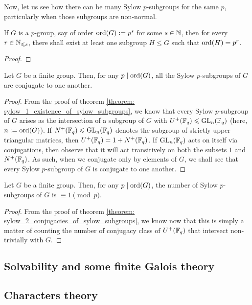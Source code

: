         Now, let us see how there can be many Sylow $p$-subgroups for the same $p$, particularly when those subgroups are non-normal.
        \begin{lemma} \label{lemma: subgroups_of_p_groups}
            If $G$ is a $p$-group, say of order $\operatorname{ord}(G) := p^s$ for some $s \in \mathbb{N}$, then for every $r \in \mathbb{N}_{\leqslant s}$, there shall exist at least one subgroup $H \leq G$ such that $\operatorname{ord}(H) = p^r$.
        \end{lemma}
            \begin{proof}
                
            \end{proof}
        \begin{theorem} \label{theorem: sylow_2_conjugacies_of_sylow_subgroups}
            Let $G$ be a finite group. Then, for any $p \mid \operatorname{ord}(G)$, all the Sylow $p$-subgroups of $G$ are conjugate to one another. 
        \end{theorem}
            \begin{proof}
                From the proof of theorem \ref{theorem: sylow_1_existence_of_sylow_subgroups}, we know that every Sylow $p$-subgroup of $G$ arises as the intersection of a subgroup of $G$ with $U^+(\mathbb{F}_q) \leqslant \mathrm{GL}_n(\mathbb{F}_q)$ (here, $n := \operatorname{ord}(G)$). If $N^+(\mathbb{F}_q) \leqslant \mathrm{GL}_n(\mathbb{F}_q)$ denotes the subgroup of strictly upper triangular matrices, then $U^+(\mathbb{F}_q) = 1 + N^+(\mathbb{F}_q)$. If $\mathrm{GL}_n(\mathbb{F}_q)$ acts on itself via conjugations, then observe that it  will act transitively on both the subsets $1$ and $N^+(\mathbb{F}_q)$. As such, when we conjugate only by elements of $G$, we shall see that every Sylow $p$-subgroup of $G$ is conjugate to one another.
            \end{proof}

        \begin{theorem} \label{theorem: sylow_3_number_of_sylow_subgroups}
            Let $G$ be a finite group. Then, for any $p \mid \operatorname{ord}(G)$, the number of Sylow $p$-subgroups of $G$ is $\equiv 1 \pmod{p}$.
        \end{theorem}
            \begin{proof}
                From the proof of theorem \ref{theorem: sylow_2_conjugacies_of_sylow_subgroups}, we know now that this is simply a matter of counting the number of conjugacy class of $U^+(\mathbb{F}_q)$ that intersect non-trivially with $G$.
            \end{proof}

    \subsection{Solvability and some finite Galois theory}

    \subsection{Characters theory}